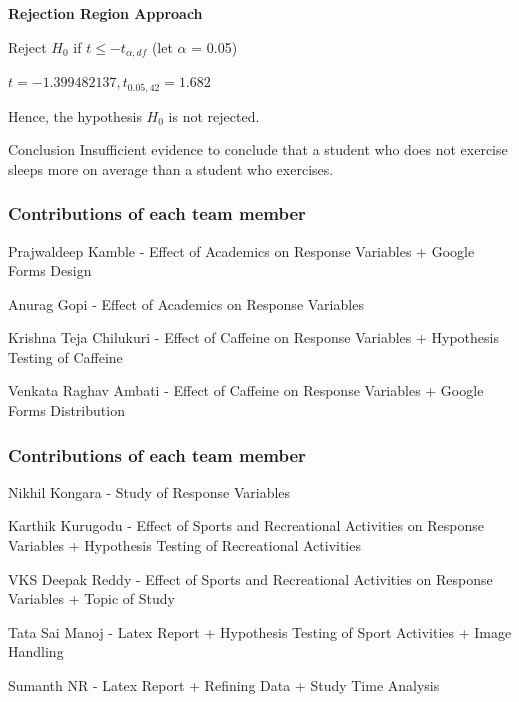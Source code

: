 \documentclass[11pt,]{beamer}
\begin{document}
\begin{frame}

    \textbf{Rejection Region Approach}
    
    Reject $H_0$ if $t \leq -t_{\alpha, df}$ (let $\alpha$ = 0.05)
    
    \bigskip
    
    $t = -1.399482137, t_{0.05, 42} = 1.682$ 
    
    \bigskip
    
    Hence, the hypothesis $H_{0}$ is not rejected. 
    
    \bigskip
    
    \begin{block}{Conclusion}
    Insufficient evidence to conclude that a student who does not exercise sleeps more on average than a student who exercises. 
    \end{block}
    
\end{frame}

\begin{frame}

    \frametitle{Contributions of each team member}
    
    Prajwaldeep Kamble - Effect of Academics on Response Variables + Google Forms Design
    
    \bigskip
    
    Anurag Gopi - Effect of Academics on Response Variables
    
    \bigskip
    
    Krishna Teja Chilukuri - Effect of Caffeine on Response Variables + Hypothesis Testing of Caffeine
    
    \bigskip
    
    Venkata Raghav Ambati - Effect of Caffeine on Response Variables + Google Forms Distribution
 
\end{frame}
 
\begin{frame}

    \frametitle{Contributions of each team member}
    
    Nikhil Kongara - Study of Response Variables 
    
    \bigskip
    
    Karthik Kurugodu - Effect of Sports and Recreational Activities on Response Variables + Hypothesis Testing of Recreational Activities
    
    \bigskip
    
    VKS Deepak Reddy - Effect of Sports and Recreational Activities on Response Variables + Topic of Study 
    
    \bigskip
    
    Tata Sai Manoj - Latex Report + Hypothesis Testing of Sport Activities + Image Handling
    
    \bigskip
    
    Sumanth NR - Latex Report + Refining Data + Study Time Analysis

\end{frame}
\end{document}
